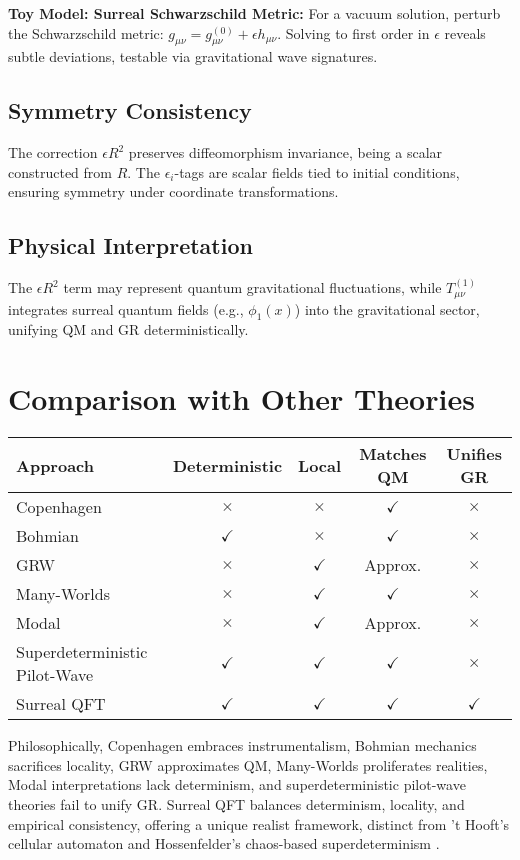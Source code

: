 \documentclass{article}
\begin{document}
\textbf{Toy Model: Surreal Schwarzschild Metric:} For a vacuum solution, perturb the Schwarzschild metric: \( g_{\mu\nu} = g_{\mu\nu}^{(0)} + \epsilon h_{\mu\nu} \). Solving to first order in \(\epsilon\) reveals subtle deviations, testable via gravitational wave signatures.

\subsection{Symmetry Consistency}
The correction \(\epsilon R^2\) preserves diffeomorphism invariance, being a scalar constructed from \( R \). The \(\epsilon_i\)-tags are scalar fields tied to initial conditions, ensuring symmetry under coordinate transformations.

\subsection{Physical Interpretation}
The \(\epsilon R^2\) term may represent quantum gravitational fluctuations, while \( T_{\mu\nu}^{(1)} \) integrates surreal quantum fields (e.g., \(\phi_1(x)\)) into the gravitational sector, unifying QM and GR deterministically.

\section{Comparison with Other Theories}
\begin{center}
\begin{tabular}{lcccc}
\hline
\textbf{Approach} & \textbf{Deterministic} & \textbf{Local} & \textbf{Matches QM} & \textbf{Unifies GR} \\
\hline
Copenhagen & $\times$ & $\times$ & $\checkmark$ & $\times$ \\
Bohmian & $\checkmark$ & $\times$ & $\checkmark$ & $\times$ \\
GRW & $\times$ & $\checkmark$ & Approx. & $\times$ \\
Many-Worlds & $\times$ & $\checkmark$ & $\checkmark$ & $\times$ \\
Modal & $\times$ & $\checkmark$ & Approx. & $\times$ \\
Superdeterministic Pilot-Wave & $\checkmark$ & $\checkmark$ & $\checkmark$ & $\times$ \\
Surreal QFT & $\checkmark$ & $\checkmark$ & $\checkmark$ & $\checkmark$ \\
\hline
\end{tabular}
\end{center}
Philosophically, Copenhagen embraces instrumentalism, Bohmian mechanics sacrifices locality, GRW approximates QM, Many-Worlds proliferates realities, Modal interpretations lack determinism, and superdeterministic pilot-wave theories fail to unify GR. Surreal QFT balances determinism, locality, and empirical consistency, offering a unique realist framework, distinct from 't Hooft's cellular automaton \cite{tHooft2014} and Hossenfelder's chaos-based superdeterminism \cite{Hossenfelder2020}.
\end{document}
